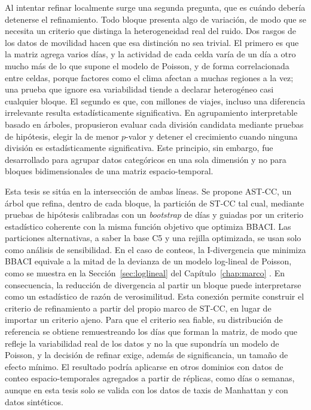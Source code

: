 Al intentar refinar localmente surge una segunda pregunta, que es cuándo
debería detenerse el refinamiento. Todo bloque presenta algo de variación, de modo que se necesita un criterio
que distinga la heterogeneidad real del ruido. Dos rasgos de los datos de
movilidad hacen que esa distinción no sea trivial. El primero es que la matriz
agrega varios días, y la actividad de cada celda varía de un día a otro mucho
más de lo que supone el modelo de Poisson, y de forma correlacionada entre
celdas, porque factores como el clima afectan a muchas regiones a la vez; una
prueba que ignore esa variabilidad tiende a declarar heterogéneo casi cualquier bloque. El
segundo es que, con millones de viajes, incluso una diferencia irrelevante
resulta estadísticamente significativa. En agrupamiento interpretable
basado en árboles, \citet{Hu2025} propusieron evaluar cada división candidata
mediante pruebas de hipótesis, elegir la de menor $p$-valor y detener el
crecimiento cuando ninguna división es estadísticamente significativa. Este
principio, sin embargo, fue desarrollado para agrupar datos categóricos en
una sola dimensión y no para bloques bidimensionales de una matriz
espacio-temporal.

Esta tesis se sitúa en la intersección de ambas líneas. Se propone
\ac{AST-CC}, un árbol que
refina, dentro de cada bloque, la partición de \ac{ST-CC} tal cual, mediante
pruebas de hipótesis calibradas con un \emph{bootstrap} de días y guiadas por
un criterio estadístico coherente con la misma función objetivo que optimiza
\ac{BBACI}. Las particiones alternativas, a saber la base C5 y una rejilla
optimizada, se usan solo como análisis de sensibilidad. En el caso de
conteos, la I-divergencia que minimiza \ac{BBACI} equivale a la mitad de la
devianza de un modelo log-lineal de Poisson, como se muestra en la
Sección~\ref{sec:loglineal} del Capítulo~\ref{chap:marco}
\citep{Banerjee2007}. En consecuencia, la reducción
de divergencia al partir un bloque puede interpretarse como un estadístico
de razón de verosimilitud. Esta conexión permite construir el criterio de
refinamiento a partir del propio marco de \ac{ST-CC}, en lugar de importar
un criterio ajeno. Para que el criterio sea fiable, su distribución de
referencia se obtiene remuestreando los días que forman la matriz, de modo que
refleje la variabilidad real de los datos y no la que supondría un modelo de
Poisson, y la decisión de refinar exige, además de significancia, un tamaño de
efecto mínimo. El resultado podría aplicarse en otros dominios con datos de
conteo espacio-temporales agregados a partir de réplicas, como días o semanas,
aunque en esta tesis solo se valida con los datos de taxis de Manhattan y con
datos sintéticos.


